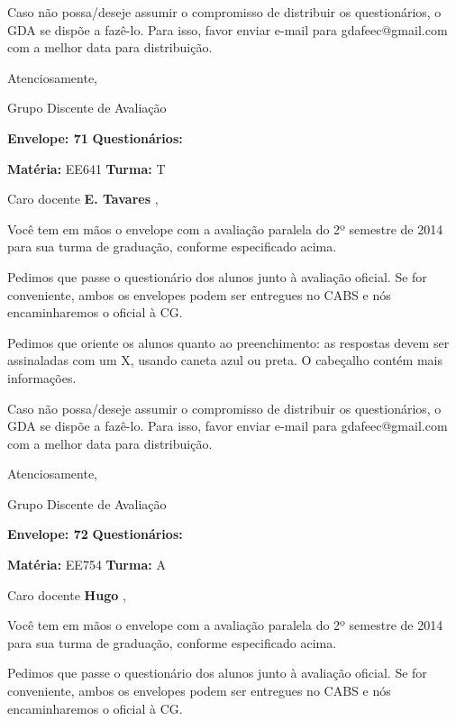 \documentclass[a5paper]{letter}
\begin{document}
	Caso não possa/deseje assumir o compromisso de distribuir os questionários, o GDA se dispõe a fazê-lo. Para isso, favor enviar e-mail para gdafeec@gmail.com com a melhor data para distribuição.


Atenciosamente, 

Grupo Discente de Avaliação

\vspace{0.5cm}

{\bf Envelope: 71 }		\hfill	{\bf Questionários:} \hspace{2cm}

\newpage
\thispagestyle{empty}

\hfill {\bf Matéria:} EE641 {\bf Turma:} T

Caro docente {\bf E. Tavares }, 

	Você tem em mãos o envelope com a avaliação paralela do 2º semestre de 2014 para sua turma de graduação, conforme especificado acima.

	Pedimos que passe o questionário dos alunos junto à avaliação oficial. Se for conveniente, ambos os envelopes podem ser entregues no CABS e nós encaminharemos o oficial à CG.

Pedimos que oriente os alunos quanto ao preenchimento: as respostas devem ser assinaladas com um X, usando caneta azul ou preta. O cabeçalho contém mais informações.

	Caso não possa/deseje assumir o compromisso de distribuir os questionários, o GDA se dispõe a fazê-lo. Para isso, favor enviar e-mail para gdafeec@gmail.com com a melhor data para distribuição.


Atenciosamente, 

Grupo Discente de Avaliação

\vspace{0.5cm}

{\bf Envelope: 72 }		\hfill	{\bf Questionários:} \hspace{2cm}

\newpage
\thispagestyle{empty}

\hfill {\bf Matéria:} EE754 {\bf Turma:} A

Caro docente {\bf Hugo }, 

	Você tem em mãos o envelope com a avaliação paralela do 2º semestre de 2014 para sua turma de graduação, conforme especificado acima.

	Pedimos que passe o questionário dos alunos junto à avaliação oficial. Se for conveniente, ambos os envelopes podem ser entregues no CABS e nós encaminharemos o oficial à CG.
\end{document}
